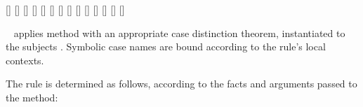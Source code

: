 \begin{isabellebody}
\begin{isamarkuptext}
\begin{railoutput}
[]
\rail@endbar
{}[]
[]
[]
[]
[]
\rail@endbar
\rail@end
{}
\rail@plus
{}
[]
\rail@endplus
\rail@end
{}
[]
[]
\rail@plus
\rail@plus
{}
[]
\rail@endplus
{}[]
\rail@endplus
\rail@end
{}
[]
[]
[]
\rail@end
\end{railoutput}


  \begin{description}

  \item \hyperlink{method.cases}{\mbox{}}~ applies method \hyperlink{method.rule}{\mbox{}} with an appropriate case distinction theorem, instantiated to
  the subjects .  Symbolic case names are bound according
  to the rule's local contexts.

  The rule is determined as follows, according to the facts and
  arguments passed to the \hyperlink{method.cases}{\mbox{}} method:


\end{description}
\end{isamarkuptext}
\end{isabellebody}
